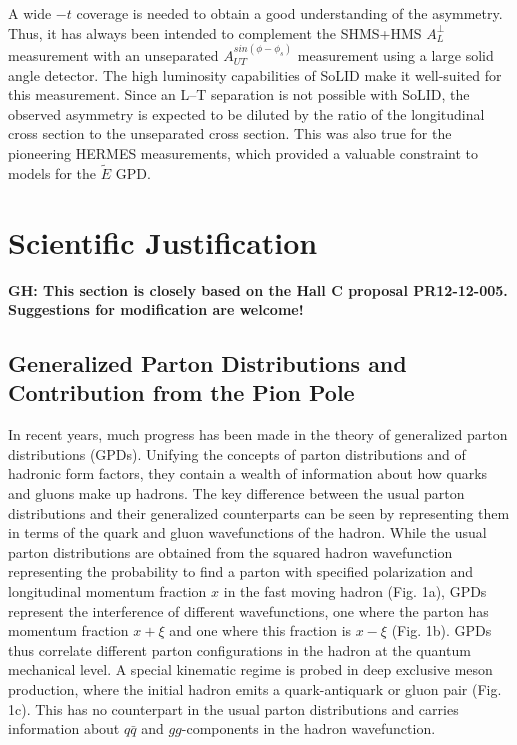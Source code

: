 \documentclass[preprint,superscriptaddress]{revtex4}
\begin{document}
A wide $-t$ coverage is needed to obtain a good understanding of the asymmetry.
Thus, it has always been intended to complement the SHMS+HMS $A_L^{\perp}$
measurement with an unseparated $A_{UT}^{sin(\phi-\phi_s)}$ measurement using
a large solid angle detector.  The high luminosity capabilities of SoLID make
it well-suited for this measurement.  Since an L--T separation is not possible
with SoLID, the observed asymmetry is expected to be diluted by the ratio of
the longitudinal cross section to the unseparated cross section.  This was also
true for the pioneering HERMES measurements, which provided a valuable
constraint to models for the $\tilde{E}$ GPD.


\clearpage

\section{Scientific Justification}

{\bf{GH: This section is closely based on the Hall C proposal
    PR12-12-005.  Suggestions for modification are welcome!}}

\subsection{Generalized Parton Distributions and Contribution from the Pion
  Pole}

In recent years, much progress has been made in the theory of generalized
parton distributions (GPDs).  Unifying the concepts of parton distributions and
of hadronic form factors, they contain a wealth of information about how quarks
and gluons make up hadrons. The key difference between the usual parton
distributions and their generalized counterparts can be seen by representing
them in terms of the quark and gluon wavefunctions of the hadron.  While the
usual parton distributions are obtained from the squared hadron wavefunction
representing the probability to find a parton with specified polarization and
longitudinal momentum fraction $x$ in the fast moving hadron (Fig. 1a), GPDs
represent the interference of different wavefunctions, one where the parton has
momentum fraction $x+\xi$ and one where this fraction is $x-\xi$ (Fig. 1b).
GPDs thus correlate different parton configurations in the hadron at the
quantum mechanical level.  A special kinematic regime is probed in deep
exclusive meson production, where the initial hadron emits a quark-antiquark or
gluon pair (Fig. 1c).  This has no counterpart in the usual parton
distributions and carries information about $q\bar{q}$ and $gg$-components in
the hadron wavefunction.
\end{document}
